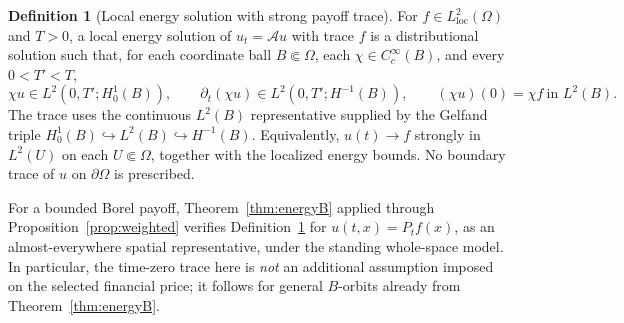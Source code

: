 \documentclass[11pt,a4paper]{article}
\theoremstyle{definition}\newtheorem{definition}{Definition}[section]\newtheorem{example}[theorem]{Example}
\theoremstyle{remark}\newtheorem{remark}[theorem]{Remark}\newtheorem{remarkSix}{Remark}[section]
\newcommand{\Cc}{C_c^\infty}
\newcommand{\loc}{\mathrm{loc}}
\newcommand{\cA}{\mathcal A}
\begin{document}
\begin{definition}[Local energy solution with strong payoff trace]\label{def:energy6}
For $f\in L^2_{\loc}(\Omega)$ and $T>0$, a local energy solution of
$u_t=\cA u$ with trace $f$ is a distributional solution such that, for each coordinate ball $B\Subset\Omega$, each $\chi\in\Cc(B)$, and every $0<T'<T$,
\begin{equation}\label{eq:energy6}
 \chi u\in L^2(0,T';H^1_0(B)),\qquad
 \partial_t(\chi u)\in L^2(0,T';H^{-1}(B)),\qquad
 (\chi u)(0)=\chi f\ \text{in }L^2(B).
\end{equation}
The trace uses the continuous $L^2(B)$ representative supplied by the Gelfand triple $H^1_0(B)\hookrightarrow L^2(B)\hookrightarrow H^{-1}(B)$. Equivalently, $u(t)\to f$ strongly in $L^2(U)$ on each $U\Subset\Omega$, together with the localized energy bounds. No boundary trace of $u$ on $\partial\Omega$ is prescribed.
\end{definition}

For a bounded Borel payoff, Theorem~\ref{thm:energyB} applied through Proposition~\ref{prop:weighted} verifies Definition~\ref{def:energy6} for $u(t,x)=P_tf(x)$, as an almost-everywhere spatial representative, under the standing whole-space model. In particular, the time-zero trace here is \emph{not} an additional assumption imposed on the selected financial price; it follows for general $B$-orbits already from Theorem~\ref{thm:energyB}.
\end{document}
